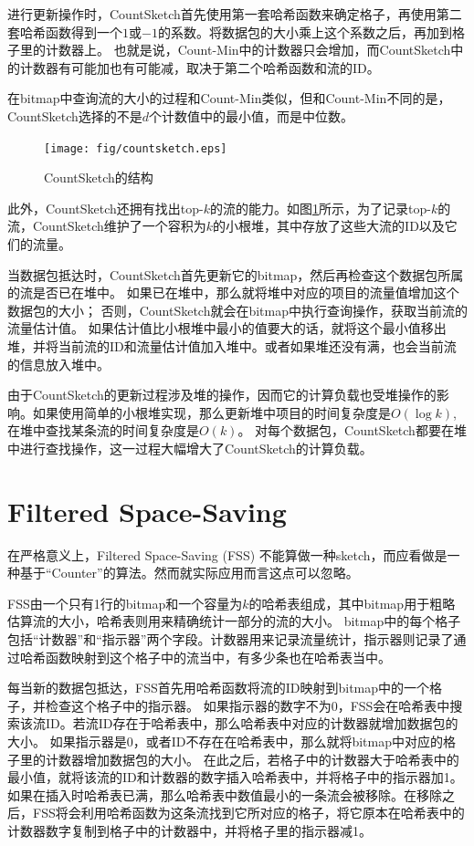 进行更新操作时，CountSketch首先使用第一套哈希函数来确定格子，再使用第二套哈希函数得到一个$1$或$-1$的系数。将数据包的大小乘上这个系数之后，再加到格子里的计数器上。
也就是说，Count-Min中的计数器只会增加，而CountSketch中的计数器有可能加也有可能减，取决于第二个哈希函数和流的ID。

在bitmap中查询流的大小的过程和Count-Min类似，但和Count-Min不同的是，CountSketch选择的不是$d$个计数值中的最小值，而是中位数。

\begin{figure}
   \centering
   \texttt{[image: fig/countsketch.eps]}
   \caption{CountSketch的结构}
   \label{fig:countsketch}
\end{figure}

此外，CountSketch还拥有找出top-$k$的流的能力。如图\ref{fig:countsketch}所示，为了记录top-$k$的流，CountSketch维护了一个容积为$k$的小根堆，其中存放了这些大流的ID以及它们的流量。

当数据包抵达时，CountSketch首先更新它的bitmap，然后再检查这个数据包所属的流是否已在堆中。
如果已在堆中，那么就将堆中对应的项目的流量值增加这个数据包的大小；
否则，CountSketch就会在bitmap中执行查询操作，获取当前流的流量估计值。
如果估计值比小根堆中最小的值要大的话，就将这个最小值移出堆，并将当前流的ID和流量估计值加入堆中。或者如果堆还没有满，也会当前流的信息放入堆中。

由于CountSketch的更新过程涉及堆的操作，因而它的计算负载也受堆操作的影响。如果使用简单的小根堆实现，那么更新堆中项目的时间复杂度是$O(\log{k})$, 在堆中查找某条流的时间复杂度是$O(k)$。
对每个数据包，CountSketch都要在堆中进行查找操作，这一过程大幅增大了CountSketch的计算负载。



\section{Filtered Space-Saving \cite{homem2010finding}}\label{sec:FSS}
在严格意义上，Filtered Space-Saving (FSS) \cite{homem2010finding}不能算做一种sketch，而应看做是一种基于“Counter”的算法。然而就实际应用而言这点可以忽略。

FSS由一个只有1行的bitmap和一个容量为$k$的哈希表组成，其中bitmap用于粗略估算流的大小，哈希表则用来精确统计一部分的流的大小。
bitmap中的每个格子包括“计数器”和“指示器”两个字段。计数器用来记录流量统计，指示器则记录了通过哈希函数映射到这个格子中的流当中，有多少条也在哈希表当中。

每当新的数据包抵达，FSS首先用哈希函数将流的ID映射到bitmap中的一个格子，并检查这个格子中的指示器。
如果指示器的数字不为0，FSS会在哈希表中搜索该流ID。若流ID存在于哈希表中，那么哈希表中对应的计数器就增加数据包的大小。
如果指示器是0，或者ID不存在在哈希表中，那么就将bitmap中对应的格子里的计数器增加数据包的大小。
在此之后，若格子中的计数器大于哈希表中的最小值，就将该流的ID和计数器的数字插入哈希表中，并将格子中的指示器加1。
如果在插入时哈希表已满，那么哈希表中数值最小的一条流会被移除。在移除之后，FSS将会利用哈希函数为这条流找到它所对应的格子，将它原本在哈希表中的计数器数字复制到格子中的计数器中，并将格子里的指示器减1。

